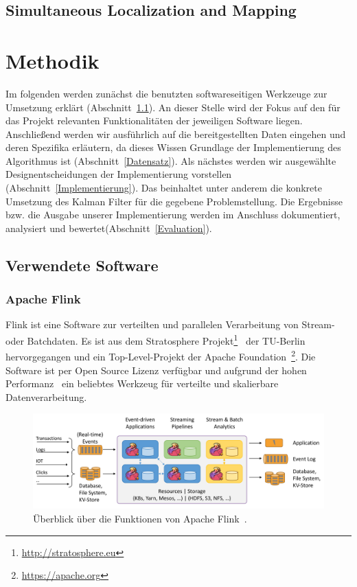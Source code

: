 \documentclass[11pt]{article}
\begin{document}
\subsection{Simultaneous Localization and Mapping}

\section{Methodik}\label{Methodik}
Im folgenden werden zunächst die benutzten softwareseitigen Werk\-zeu\-ge zur Umsetzung erklärt (Abschnitt~\ref{Verwendete-Software}). An dieser Stelle wird der Fokus auf den für das Projekt relevanten Funktionalitäten der jeweiligen Software liegen. Anschließend werden wir ausführlich auf die bereitgestellten Daten eingehen und deren Spezifika erläutern, da dieses Wissen Grundlage der Implementierung des Algorithmus ist (Abschnitt~\ref{Datensatz}). Als nächstes werden wir ausgewählte Designentscheidungen der Implementierung vorstellen (Abschnitt~\ref{Implementierung}). Das beinhaltet unter anderem die konkrete Umsetzung des Kalman Filter für die gegebene Problemstellung. Die Ergebnisse bzw. die Ausgabe unserer Implementierung werden im Anschluss dokumentiert, analysiert und bewertet(Abschnitt~\ref{Evaluation}).

\subsection{Verwendete Software}\label{Verwendete-Software}
\subsubsection{Apache Flink}
Flink ist eine Software zur verteilten und parallelen Verarbeitung von Stream- oder Batch\-daten. Es ist aus dem Stratosphere Projekt\footnote{\url{http://stratosphere.eu}}~\cite{alexandrov_stratosphere_2014} der TU-Berlin hervorgegangen und ein Top-Level-Projekt der Apache Foundation~\footnote{\url{https://apache.org}}. Die Software ist per Open Source Lizenz verfügbar und aufgrund der hohen Performanz~\cite{alexandrov_stratosphere_2014} ein beliebtes Werkzeug für verteilte und skalierbare Datenverarbeitung.

\begin{figure}[!t]
	\centering
	\includegraphics[width=5.5in]{flink-home-graphic.png}
	\caption{Überblick über die Funktionen von Apache Flink~\cite{Flink-Overview-Link}.}
	\label{Flink-Überblick}
\end{figure}
\end{document}
